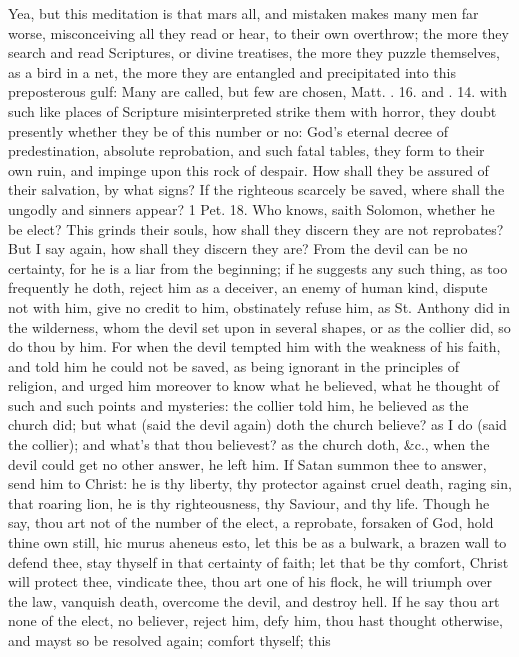 {Yea, but this meditation is that mars all, and mistaken makes many men
far worse, misconceiving all they read or hear, to their own overthrow;
the more they search and read Scriptures, or divine treatises, the more
they puzzle themselves, as a bird in a net, the more they are entangled
and precipitated into this preposterous gulf: Many are called, but few
are chosen, Matt. . 16. and . 14. with such like places of
Scripture misinterpreted strike them with horror, they doubt presently
whether they be of this number or no: God's eternal decree of
predestination, absolute reprobation, and such fatal tables, they form
to their own ruin, and impinge upon this rock of despair. How shall
they be assured of their salvation, by what signs? If the righteous
scarcely be saved, where shall the ungodly and sinners appear? 1 Pet.
 18. Who knows, saith Solomon, whether he be elect? This grinds
their souls, how shall they discern they are not reprobates? But I say
again, how shall they discern they are? From the devil can be no
certainty, for he is a liar from the beginning; if he suggests any such
thing, as too frequently he doth, reject him as a deceiver, an enemy of
human kind, dispute not with him, give no credit to him, obstinately
refuse him, as St. Anthony did in the wilderness, whom the devil set
upon in several shapes, or as the collier did, so do thou by him. For
when the devil tempted him with the weakness of his faith, and told him
he could not be saved, as being ignorant in the principles of religion,
and urged him moreover to know what he believed, what he thought of
such and such points and mysteries: the collier told him, he believed
as the church did; but what (said the devil again) doth the church
believe? as I do (said the collier); and what's that thou believest? as
the church doth, \&c., when the devil could get no other answer, he left
him. If Satan summon thee to answer, send him to Christ: he is thy
liberty, thy protector against cruel death, raging sin, that roaring
lion, he is thy righteousness, thy Saviour, and thy life. Though he
say, thou art not of the number of the elect, a reprobate, forsaken of
God, hold thine own still, hic murus aheneus esto, let this be as a
bulwark, a brazen wall to defend thee, stay thyself in that certainty
of faith; let that be thy comfort, Christ will protect thee, vindicate
thee, thou art one of his flock, he will triumph over the law, vanquish
death, overcome the devil, and destroy hell. If he say thou art none of
the elect, no believer, reject him, defy him, thou hast thought
otherwise, and mayst so be resolved again; comfort thyself; this
}
